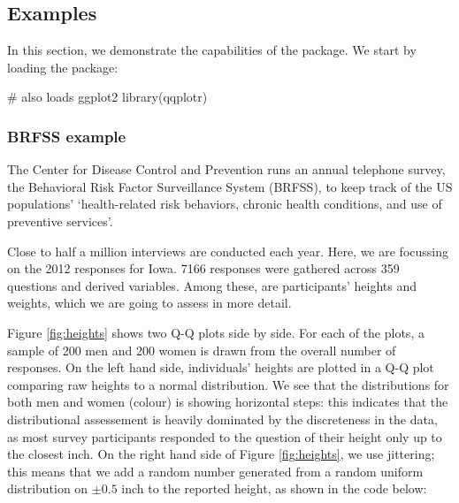 
\FloatBarrier

\subsection{Examples}\label{examples}

\label{sec:examples}

In this section, we demonstrate the capabilities of the 
package. We start by loading the package:

\begin{Schunk}
\begin{Sinput}
# also loads ggplot2
library(qqplotr)
\end{Sinput}
\end{Schunk}

\subsubsection{BRFSS example}\label{brfss-example}

The Center for Disease Control and Prevention runs an annual telephone
survey, the Behavioral Risk Factor Surveillance System (BRFSS), to keep
track of the US populations' `health-related risk behaviors, chronic
health conditions, and use of preventive services'.

Close to half a million interviews are conducted each year. Here, we are
focussing on the 2012 responses for Iowa. 7166 responses were gathered
across 359 questions and derived variables. Among these, are
participants' heights and weights, which we are going to assess in more
detail.

Figure \ref{fig:heights} shows two Q-Q plots side by side. For each of
the plots, a sample of 200 men and 200 women is drawn from the overall
number of responses. On the left hand side, individuals' heights are
plotted in a Q-Q plot comparing raw heights to a normal distribution. We
see that the distributions for both men and women (colour) is showing
horizontal steps: this indicates that the distributional assessement is
heavily dominated by the discreteness in the data, as most survey
participants responded to the question of their height only up to the
closest inch. On the right hand side of Figure \ref{fig:heights}, we use
jittering; this means that we add a random number generated from a
random uniform distribution on \(\pm 0.5\) inch to the reported height,
as shown in the code below:

